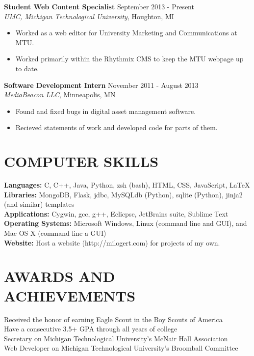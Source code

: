 \documentclass[line,margin]{res}
\begin{document}
\begin{resume}
\begin{itemize}
\end{itemize}

{\bf Student Web Content Specialist} \hfill September 2013 - Present \\
{\sl UMC, Michigan Technological University}, Houghton, MI
\begin{itemize}

  \itemsep -2pt %

  \item Worked as a web editor for University Marketing and Communications at MTU.
  \item Worked primarily within the Rhythmix CMS to keep the MTU webpage up to date.

\end{itemize}

{\bf Software Development Intern} \hfill November 2011 - August 2013 \\
{\sl MediaBeacon LLC}, Minneapolis, MN
\begin{itemize}

  \itemsep -2pt %

  \item Found and fixed bugs in digital asset management software.
  \item Recieved statements of work and developed code for parts of them.

\end{itemize}


\section{COMPUTER SKILLS}

{\bf Languages:} C, C++, Java, Python, zsh (bash), HTML, CSS, JavaScript, LaTeX \\
{\bf Libraries:} MongoDB, Flask, jdbc, MySQLdb (Python), sqlite (Python), jinja2 (and similar) templates \\
{\bf Applications:} Cygwin, gcc, g++, Eclicpse, JetBrains suite, Sublime Text \\
{\bf Operating Systems:} Microsoft Windows, Linux (command line and GUI), and Mac OS X (command line a GUI) \\
{\bf Website:} Host a website (http://milogert.com) for projects of my own.


\section{AWARDS AND ACHIEVEMENTS}

Received the honor of earning Eagle Scout in the Boy Scouts of America \\
Have a consecutive 3.5+ GPA through all years of college \\
Secretary on Michigan Technological University’s McNair Hall Association \\
Web Developer on Michigan Technological University’s Broomball Committee

\end{resume}
\end{document}
